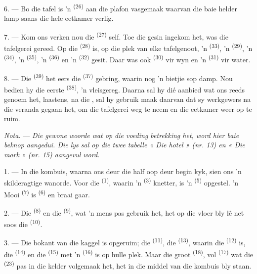 6. --- Bo die tafel is 'n  \textsuperscript{(26)} aan die plafon
vasgemaak waarvan die baie helder lamp saans die hele eetkamer verlig.

7. --- Kom ons verken nou die  \textsuperscript{(27)} self. Toe die
gesin ingekom het, was die tafelgerei gereed. Op die 
\textsuperscript{(28)} is, op die plek van elke tafelgenoot, 'n 
\textsuperscript{(33)}, 'n  \textsuperscript{(29)}, 'n 
\textsuperscript{(34)}, 'n  \textsuperscript{(35)}, 'n 
\textsuperscript{(36)} en 'n  \textsuperscript{(32)} gesit. Daar was ook
 \textsuperscript{(30)} vir wyn en 'n 
\textsuperscript{(31)} vir water.

8. --- Die  \textsuperscript{(39)} het eers die 
\textsuperscript{(37)} gebring, waarin nog 'n bietjie sop damp. Nou bedien hy die eerste
 \textsuperscript{(38)}, 'n vleisgereg. Daarna sal hy dié aanbied wat ons
reeds genoem het, laastens, na die , sal hy gebruik maak daarvan dat sy
werkgewers na die veranda gegaan het, om die tafelgerei weg te neem en die eetkamer weer
op te ruim.

\textit{Nota.} --- \textit{Die gewone woorde wat op die voeding betrekking het, word hier
baie beknop aangedui. Die lys sal op die twee tabelle « Die hotel » (nr. 13) en « Die
mark » (nr. 15) aangevul word.}

\VUsaut{4.6mm}
\VUsaut{3.0mm}

1. --- In die kombuis, waarna ons deur die half oop deur begin kyk, sien ons 'n
skilderagtige wanorde. Voor die  \textsuperscript{(1)}, waarin 'n
 \textsuperscript{(3)} knetter, is 'n 
\textsuperscript{(5)} opgestel. 'n Mooi  \textsuperscript{(7)} is
 \textsuperscript{(6)} en braai gaar.

2. --- Die  \textsuperscript{(8)} en die 
\textsuperscript{(9)}, wat 'n mens pas gebruik het, het op die vloer bly lê net soos die
 \textsuperscript{(10)}.

3. --- Die bokant van die kaggel is opgeruim; die 
\textsuperscript{(11)}, die  \textsuperscript{(13)}, waarin die
 \textsuperscript{(12)} is, die 
\textsuperscript{(14)} en die  \textsuperscript{(15)} met 'n
 \textsuperscript{(16)} is op hulle plek. Maar die groot 
\textsuperscript{(18)}, vol  \textsuperscript{(17)} wat die
 \textsuperscript{(23)} pas in die kelder volgemaak het, het in die middel
van die kombuis bly staan.

